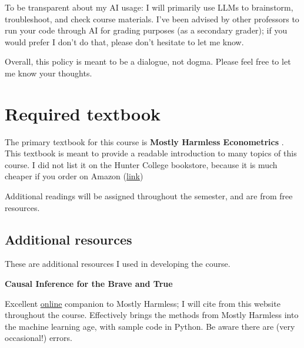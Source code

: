 \documentclass[11 pt]{article}
\begin{document}
To be transparent about my AI usage: I will primarily use LLMs to brainstorm, troubleshoot, and check course materials.
I've been advised by other professors to run your code through AI for grading purposes (as a secondary grader); if you would prefer I don't do that, please don't hesitate to let me know. 

Overall, this policy is meant to be a dialogue, not dogma. 
Please feel free to let me know your thoughts. 



\section*{Required textbook}

The primary textbook for this course is \textbf{Mostly Harmless Econometrics} \parencite{AP09}.
This textbook is meant to provide a readable introduction to many topics of this course. 
I did not list it on the Hunter College bookstore, because it is much cheaper if you order on Amazon (\href{https://www.amazon.com/Mostly-Harmless-Econometrics-Empiricists-Companion/dp/0691120358/ref=sr_1_1?adgrpid=1227055302933586&dib=eyJ2IjoiMSJ9.miIdw25tOmutaXlv500au4xpviIV3geiWQ_DkyRWKJlEws_8EbzeALEGY_-R7BVVY4kDLyV4neIHMrn8qoYBZvb50DTyuPCO8Vn9VF7WzQDWcas0n5FLu5mBvQFaS-7tw2CqO66FDgnGH-ZRWn09LA.hynR_nkYtrHiYr2_l6nk-n5IzHjRQduC6oNkpeWgvqE&dib_tag=se&hvadid=76691122015644&hvbmt=be&hvdev=c&hvlocphy=97793&hvnetw=s&hvqmt=e&hvtargid=kwd-76691206557062%3Aloc-190&hydadcr=22160_13439067&keywords=mostly+harmless+econometrics&mcid=48817c499db83be19176cdf4dc4fc94f&msclkid=2f5b328c5b4c1a5f8d885a2f16a5ef4c&qid=1755532783&sr=8-1}{link})


Additional readings will be assigned throughout the semester, and are from free resources. 

\subsection*{Additional resources}

These are additional resources I used in developing the course. 

\textbf{Causal Inference for the Brave and True}
\parencite{A22} 
\begin{blist}
\item Excellent \href{https://matheusfacure.github.io/python-causality-handbook/landing-page.html}{online} companion to Mostly Harmless; I will cite from this website throughout the course. Effectively brings the methods from Mostly Harmless into the machine learning age, with sample code in Python. Be aware there are (very occasional!) errors.
\end{blist}
\end{document}
